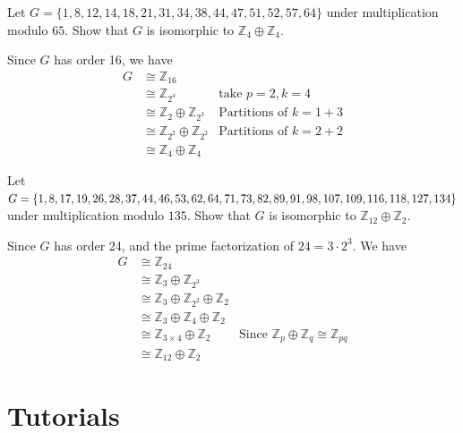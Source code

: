 \begin{example}
    Let $G =\{1, 8, 12, 14, 18, 21, 31, 34, 38, 44, 47, 51, 52, 57, 64 \}$ under multiplication modulo $65$. 
    Show that $G$ is isomorphic to $\mathbb{Z}_4 \oplus \mathbb{Z}_4$.
\end{example}
\begin{solution}
    Since $G$ has order 16, we have 
    \begin{align*}
        G &\cong \mathbb{Z}_{16}\\
        &\cong \mathbb{Z}_{2^4} & \text{take } p=2, k = 4\\
        &\cong \mathbb{Z}_{2} \oplus \mathbb{Z}_{2^3} & \text{Partitions of } k = 1 + 3\\
        &\cong \mathbb{Z}_{2^2} \oplus \mathbb{Z}_{2^2} & \text{Partitions of } k = 2 + 2\\
        &\cong \mathbb{Z}_{4} \oplus \mathbb{Z}_{4}
    \end{align*}
\end{solution}

\begin{example}
    Let $G =\{1, 8, 17, 19, 26, 28, 37, 44, 46, 53, 62, 64, 71, 73, 82, 89,\\ 91, 98, 107,
    109, 116, 118, 127, 134 \}$ under multiplication modulo $135$. 
    Show that $G$ is isomorphic to $\mathbb{Z}_{12} \oplus \mathbb{Z}_2$.
\end{example}
\begin{solution}
    Since $G$ has order 24, and the prime factorization of $24 = 3 \cdot 2^3$. We have 
    \begin{align*}
        G &\cong \mathbb{Z}_{24}\\
        &\cong \mathbb{Z}_{3} \oplus \mathbb{Z}_{2^3}\\
        &\cong \mathbb{Z}_{3} \oplus \mathbb{Z}_{2^2} \oplus \mathbb{Z}_2\\
        &\cong \mathbb{Z}_{3} \oplus \mathbb{Z}_{4} \oplus \mathbb{Z}_2\\
        &\cong \mathbb{Z}_{3 \times 4} \oplus \mathbb{Z}_2 & \text{Since } \mathbb{Z}_p \oplus \mathbb{Z}_q \cong \mathbb{Z}_{pq} \\
        &\cong \mathbb{Z}_{12} \oplus \mathbb{Z}_2
    \end{align*}
\end{solution}

\section*{Tutorials}

